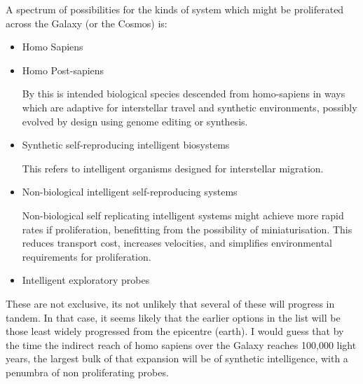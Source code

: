 \documentclass[10pt,titlepage]{article}
\begin{document}
A spectrum of possibilities for the kinds of system which might be proliferated across the Galaxy (or the Cosmos) is:

\begin{itemize}

\item Homo Sapiens

\item Homo Post-sapiens

  By this is intended biological species descended from homo-sapiens in ways which are adaptive for interstellar travel and synthetic environments, possibly evolved by design using genome editing or synthesis.

\item Synthetic self-reproducing intelligent biosystems

  This refers to intelligent organisms designed for interstellar migration.

\item Non-biological intelligent self-reproducing systems

  Non-biological self replicating intelligent systems might achieve more rapid rates if proliferation, benefitting from the possibility of miniaturisation.
  This reduces transport cost, increases velocities, and simplifies environmental requirements for proliferation.

\item Intelligent exploratory probes

\end{itemize}

These are not exclusive, its not unlikely that several of these will progress in tandem.
In that case, it seems likely that the earlier options in the list will be those least widely progressed from the epicentre (earth).
I would guess that by the time the indirect reach of homo sapiens over the Galaxy reaches 100,000 light years, the largest bulk of that expansion will be of synthetic intelligence, with a penumbra of non proliferating probes.
\end{document}
